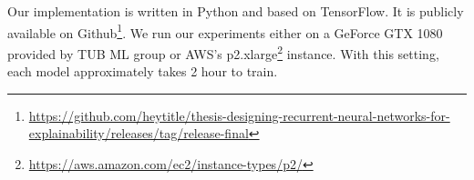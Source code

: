 Our implementation is written in Python and based on TensorFlow\cite{AbadiTensorFlowLargeScaleMachine2016}. It is publicly available on Github\footnote{\url{https://github.com/heytitle/thesis-designing-recurrent-neural-networks-for-explainability/releases/tag/release-final}}.  We run our experiments either on a GeForce GTX 1080 provided by TUB ML group or AWS's p2.xlarge\footnote{\url{https://aws.amazon.com/ec2/instance-types/p2/}} instance. With this setting, each model approximately takes 2 hour to train.



 
%
%
%
%
%
%

